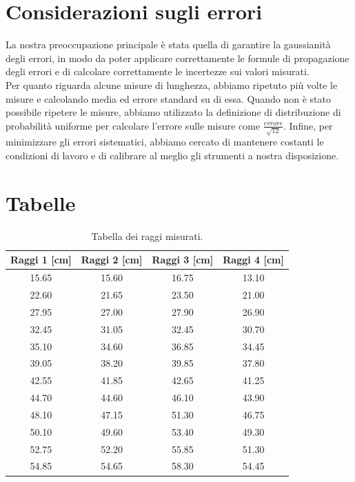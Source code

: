 \documentclass[letterpaper,12pt]{article}
\begin{document}
\section{Considerazioni sugli errori}
\label{sec:errori}

La nostra preoccupazione principale è stata quella di garantire la gaussianità degli errori, in modo da poter
applicare correttamente le formule di propagazione degli errori e di calcolare correttamente le incertezze sui
valori misurati.\\
Per quanto riguarda alcune misure di lunghezza, abbiamo ripetuto più volte le misure e calcolando media ed errore standard su di essa.
Quando non è stato possibile ripetere le misure, abbiamo utilizzato la definizione di distribuzione di probabilità uniforme per calcolare l'errore
sulle misure come $ \frac{errore}{\sqrt{12}} $.
Infine, per minimizzare gli errori sistematici, abbiamo cercato di mantenere costanti le condizioni di lavoro e di calibrare
al meglio gli strumenti a nostra disposizione.\\


\section{Tabelle}

\begin{table}[h!]
    \centering
    \begin{tabular}{|c|c|c|c|}
    \hline
    \textbf{Raggi 1 [cm]} & \textbf{Raggi 2 [cm]} & \textbf{Raggi 3 [cm]} & \textbf{Raggi 4 [cm]} \\
    \hline
    15.65 & 15.60 & 16.75 & 13.10 \\
    22.60 & 21.65 & 23.50 & 21.00 \\
    27.95 & 27.00 & 27.90 & 26.90 \\
    32.45 & 31.05 & 32.45 & 30.70 \\
    35.10 & 34.60 & 36.85 & 34.45 \\
    39.05 & 38.20 & 39.85 & 37.80 \\
    42.55 & 41.85 & 42.65 & 41.25 \\
    44.70 & 44.60 & 46.10 & 43.90 \\
    48.10 & 47.15 & 51.30 & 46.75 \\
    50.10 & 49.60 & 53.40 & 49.30 \\
    52.75 & 52.20 & 55.85 & 51.30 \\
    54.85 & 54.65 & 58.30 & 54.45 \\
    \hline
    \end{tabular}
    \caption{Tabella dei raggi misurati.}
    \label{tab:raggi_fabry_perot}
\end{table}
\end{document}
